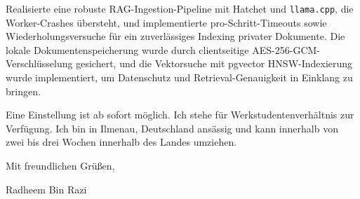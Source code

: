 \documentclass[11pt,a4paper]{coverletter}
\begin{document}
  \item Realisierte eine robuste RAG-Ingestion-Pipeline mit Hatchet und \texttt{llama.cpp}, die Worker-Crashes übersteht, und implementierte pro-Schritt-Timeouts sowie Wiederholungsversuche für ein zuverlässiges Indexing privater Dokumente. Die lokale Dokumentenspeicherung wurde durch clientseitige AES-256-GCM-Verschlüsselung gesichert, und die Vektorsuche mit pgvector HNSW-Indexierung wurde implementiert, um Datenschutz und Retrieval-Genauigkeit in Einklang zu bringen.

\bulletsend

Eine Einstellung ist ab sofort möglich. Ich stehe für Werkstudentenverhältnis zur Verfügung. Ich bin in Ilmenau, Deutschland ansässig und kann innerhalb von zwei bis drei Wochen innerhalb des Landes umziehen.

\closing{Mit freundlichen Grüßen,}{Radheem Bin Razi}
\end{document}

